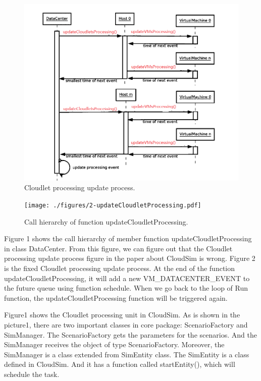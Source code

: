 \begin{figure}
	\centering
	\includegraphics[width=1\textwidth]{./figures/3-processingSequence.png}
	\caption{\label{fig:processingSequence}Cloudlet processing update process.}
\end{figure}

\begin{figure}
	\centering
	\texttt{[image: ./figures/2-updateCloudletProcessing.pdf]}
	\caption{\label{fig:cloudletProcessing}Call hierarchy of function updateCloudletProcessing.}
\end{figure}

Figure 1 shows the call hierarchy of member function updateCloudletProcessing in class DataCenter. From this figure, we can figure out that the Cloudlet processing update process figure in the paper about CloudSim is wrong. Figure 2 is the fixed Cloudlet processing update process. At the end of the function updateCloudletProcessing, it will add a new VM\_DATACENTER\_EVENT to the future queue using function schedule. When we go back to the loop of Run function, the updateCloudletProcessing function will be triggered again.

Figure1 shows the Cloudlet processing unit in CloudSim. As is shown in the picture1, there are two important classes in core package: ScenarioFactory and SimManager. The ScenarioFactory gets the parameters for the scenarios. And the SimManager receives the object of type ScenarioFactory. Moreover, the SimManager is a class extended from SimEntity class. The SimEntity is a class defined in CloudSim. And it has a function called startEntity(), which will schedule the task. 


